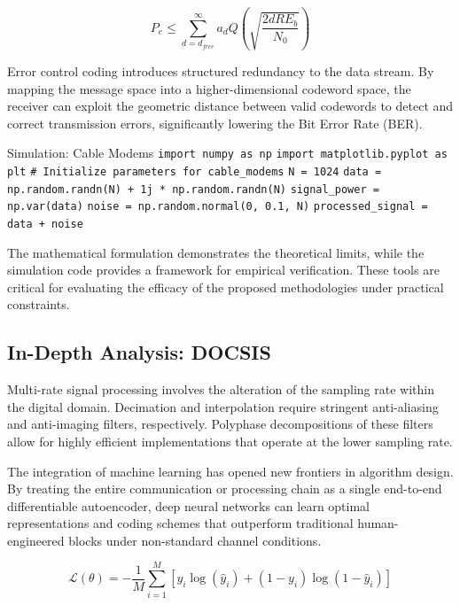 \begin{equation}
    P_e \leq \sum_{d=d_{free}}^{\infty} a_d Q\left(\sqrt{\frac{2 d R E_b}{N_0}}\right)
\end{equation}

Error control coding introduces structured redundancy to the data stream. By mapping the message space into a higher-dimensional codeword space, the receiver can exploit the geometric distance between valid codewords to detect and correct transmission errors, significantly lowering the Bit Error Rate (BER).

\begin{pythonbox}{Simulation: Cable Modems}
\texttt{import numpy as np}
\texttt{import matplotlib.pyplot as plt}
\texttt{}
\texttt{\# Initialize parameters for cable\_modems}
\texttt{N = 1024}
\texttt{data = np.random.randn(N) + 1j * np.random.randn(N)}
\texttt{signal\_power = np.var(data)}
\texttt{noise = np.random.normal(0, 0.1, N)}
\texttt{processed\_signal = data + noise}
\end{pythonbox}

\vspace{0.5cm}
The mathematical formulation demonstrates the theoretical limits, while the simulation code provides a framework for empirical verification. These tools are critical for evaluating the efficacy of the proposed methodologies under practical constraints.


\subsection{In-Depth Analysis: DOCSIS}
Multi-rate signal processing involves the alteration of the sampling rate within the digital domain. Decimation and interpolation require stringent anti-aliasing and anti-imaging filters, respectively. Polyphase decompositions of these filters allow for highly efficient implementations that operate at the lower sampling rate.

The integration of machine learning has opened new frontiers in algorithm design. By treating the entire communication or processing chain as a single end-to-end differentiable autoencoder, deep neural networks can learn optimal representations and coding schemes that outperform traditional human-engineered blocks under non-standard channel conditions.

\begin{equation}
    \mathcal{L}(\theta) = -\frac{1}{M} \sum_{i=1}^{M} \left[ y_i \log(\hat{y}_i) + (1-y_i)\log(1-\hat{y}_i) \right]
\end{equation}

